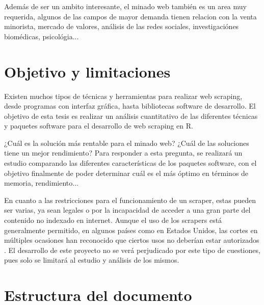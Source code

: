 Además de ser un ambito interesante, el minado web también es un area muy requerida, algunos de las campos 
de mayor demanda tienen relacion con la venta minorista, mercado de valores, análisis de las redes sociales, 
investigaciónes biomédicas, psicológia...

\section{Objetivo y limitaciones}
\label{sec:objetivo y limitaciones}

Existen muchos tipos de técnicas y herramientas para realizar web scraping, desde programas con interfaz
gráfica, hasta bibliotecas software de desarrollo. El objetivo de esta tesis es realizar un análisis
cuantitativo de las diferentes técnicas y paquetes software para el desarrollo de web scraping en R.

¿Cuál es la solución más rentable para el minado web? ¿Cuál de las soluciones tiene un mejor rendimiento?
Para responder a esta pregunta, se realizará un estudio comparando las diferentes características de los
paquetes software, con el objetivo finalmente de poder determinar cuál es el más óptimo en términos de
memoria, rendimiento...

En cuanto a las restricciones para el funcionamiento de un scraper, estas pueden ser varias, ya sean legales 
o por la incapacidad de acceder a una gran parte del contenido no indexado en internet. Aunque el uso de 
los scrapers está generalmente permitido, en algunos países como en Estados Unidos, las cortes en múltiples
ocasiones han reconocido que ciertos usos no deberían estar autorizados \cite{web-scraping-wikipedia}.
El desarrollo de este proyecto no se verá perjudicado por este tipo de cuestiones, pues solo se limitará
al estudio y análisis de los mismos.

\section{Estructura del documento}
\label{sec:estructura del documento}


